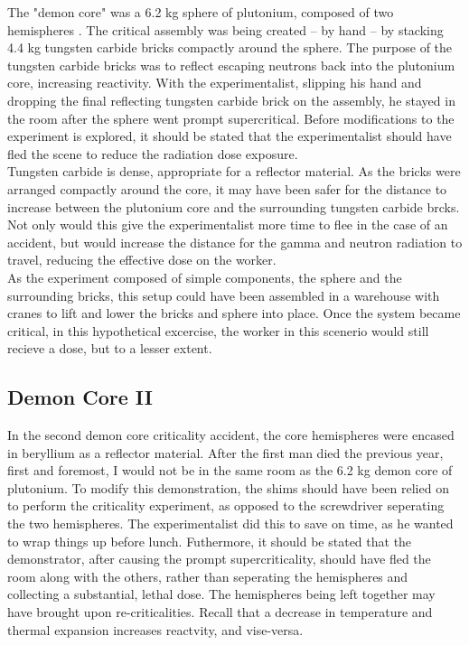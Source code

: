\documentclass[11pt,a4paper]{article}
\begin{document}
The "demon core" was a 6.2 kg sphere of plutonium, composed of two hemispheres \cite{LA-13638}. The critical assembly was being created -- by hand -- by stacking 4.4 kg tungsten carbide bricks compactly around the sphere. The purpose of the tungsten carbide bricks was to reflect escaping neutrons back into the plutonium core, increasing reactivity. With the experimentalist, slipping his hand and dropping the final reflecting tungsten carbide brick on the assembly, he stayed in the room after the sphere went prompt supercritical. Before modifications to the experiment is explored, it should be stated that the experimentalist should have fled the scene to reduce the radiation dose exposure. \\
Tungsten carbide is dense, appropriate for a reflector material. As the bricks were arranged compactly around the core, it may have been safer for the distance to increase between the plutonium core and the surrounding tungsten carbide brcks. Not only would this give the experimentalist more time to flee in the case of an accident, but would increase the distance for the gamma and neutron radiation to travel, reducing the effective dose on the worker. \\
As the experiment composed of simple components, the sphere and the surrounding bricks, this setup could have been assembled in a warehouse with cranes to lift and lower the bricks and sphere into place. Once the system became critical, in this hypothetical excercise, the worker in this scenerio would still recieve a dose, but to a lesser extent.

\subsection{Demon Core II}

In the second demon core criticality accident, the core hemispheres were encased in beryllium as a reflector material. After the first man died the previous year, first and foremost, I would not be in the same room as the 6.2 kg demon core of plutonium. To modify this demonstration, the shims should have been relied on to perform the criticality experiment, as opposed to the screwdriver seperating the two hemispheres. The experimentalist did this to save on time, as he wanted to wrap things up before lunch. Futhermore, it should be stated that the demonstrator, after causing the prompt supercriticality, should have fled the room along with the others, rather than seperating the hemispheres and collecting a substantial, lethal dose. The hemispheres being left together may have brought upon re-criticalities. Recall that a decrease in temperature and thermal expansion increases reactvity, and vise-versa. \\
\end{document}
